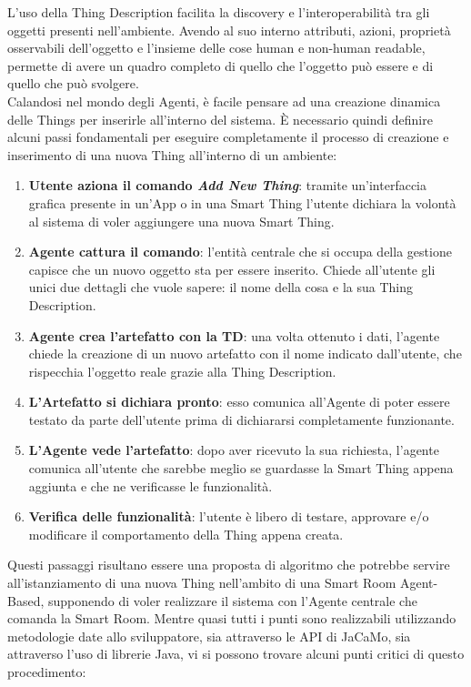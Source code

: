 \documentclass[12pt,a4paper,openright,oneside]{report}
\begin{document}
L'uso della Thing Description facilita la discovery e l'interoperabilità tra gli oggetti presenti nell'ambiente. Avendo al suo interno attributi, azioni, proprietà osservabili dell'oggetto e l'insieme delle cose human e non-human readable, permette di avere un quadro completo di quello che l'oggetto può essere e di quello che può svolgere.\\

Calandosi nel mondo degli Agenti, è facile pensare ad una creazione dinamica delle Things per inserirle all'interno del sistema. È necessario quindi definire alcuni passi fondamentali per eseguire completamente il processo di creazione e inserimento di una nuova Thing all'interno di un ambiente:

\begin{enumerate}
	\item \textbf{Utente aziona il comando \textit{Add New Thing}}: tramite un'interfaccia grafica presente in un'App o in una Smart Thing l'utente dichiara la volontà al sistema di voler aggiungere una nuova Smart Thing.
	
	\item \textbf{Agente cattura il comando}: l'entità centrale che si occupa della gestione capisce che un nuovo oggetto sta per essere inserito. Chiede all'utente gli unici due dettagli che vuole sapere: il nome della cosa e la sua Thing Description.
	
	\item \textbf{Agente crea l'artefatto con la TD}: una volta ottenuto i dati, l'agente chiede la creazione di un nuovo artefatto con il nome indicato dall'utente, che rispecchia l'oggetto reale grazie alla Thing Description.
	
	\item \textbf{L'Artefatto si dichiara pronto}: esso comunica all'Agente di poter essere testato da parte dell'utente prima di dichiararsi completamente funzionante.
	
	\item \textbf{L'Agente vede l'artefatto}: dopo aver ricevuto la sua richiesta, l'agente comunica all'utente che sarebbe meglio se guardasse la Smart Thing appena aggiunta e che ne verificasse le funzionalità.
	
	\item \textbf{Verifica delle funzionalità}: l'utente è libero di testare, approvare e/o modificare il comportamento della Thing appena creata.
\end{enumerate}

Questi passaggi risultano essere una proposta di algoritmo che potrebbe servire all'istanziamento di una nuova Thing nell'ambito di una Smart Room Agent-Based, supponendo di voler realizzare il sistema con l'Agente centrale che comanda la Smart Room. Mentre quasi tutti i punti sono realizzabili utilizzando metodologie date allo sviluppatore, sia attraverso le API di JaCaMo, sia attraverso l'uso di librerie Java, vi si possono trovare alcuni punti critici di questo procedimento:
\end{document}
